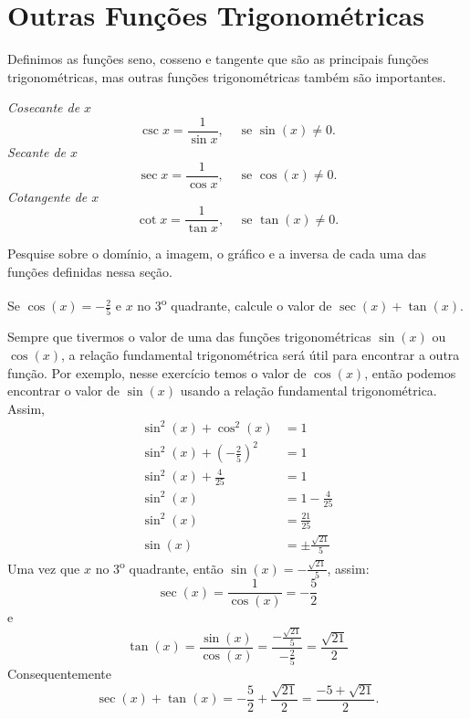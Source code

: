 \section{Outras Funções Trigonométricas}

Definimos as funções seno, cosseno e tangente que são as principais funções
trigonométricas, mas outras funções trigonométricas também são importantes.

\emph{Cosecante de $x$}
\[
  \csc x = \frac{1}{\sin x}, \quad\text{ se } \sin(x) \neq 0.
\]
\emph{Secante de $x$}
\[
  \sec x=\frac{1}{\cos x}, \quad\text{ se } \cos(x) \neq 0.
\]
\emph{Cotangente de $x$}
\[
  \cot x=\frac{1}{\tan x}, \quad\text{ se } \tan(x) \neq 0.
\]

\begin{example}
  Pesquise sobre o domínio, a imagem, o gráfico e a inversa de cada uma das
  funções definidas nessa seção.
\end{example}

\begin{example}
  Se \(\cos(x)= -\frac{2}{5}\) e $x$ no 3\textsuperscript{o} quadrante,
  calcule o valor de $\sec(x)+\tan(x)$.

  \solution
  Sempre que tivermos o valor de uma das funções trigonométricas $\sin(x)$ ou
  $\cos(x)$, a relação fundamental trigonométrica será útil para
  encontrar a outra função. Por exemplo, nesse exercício temos o valor de
  $\cos(x)$, então podemos encontrar o valor de $\sin(x)$ usando a
  relação fundamental trigonométrica. Assim,
  \begin{align*}
    \sin^2(x) + \cos^2(x)                     & = 1                       \\
    \sin^2(x) + \left( -\frac{2}{5} \right)^2 & = 1                       \\
    \sin^2(x) + \frac{4}{25}                  & = 1                       \\
    \sin^2(x)                                 & = 1- \frac{4}{25}         \\
    \sin^2(x)                                 & = \frac{21}{25}           \\
    \sin(x)                                   & = \pm \frac{\sqrt{21}}{5}
  \end{align*}
  Uma vez que $x$ no 3\textsuperscript{o} quadrante, então
  $\sin(x) = -\frac{\sqrt{21}}{5}$, assim:
  \[
    \sec(x)
    = \frac{1}{\cos(x)}
    =-\frac{5}{2}
  \]
  e
  \[
    \tan(x)
    = \frac{\sin(x)}{\cos(x)}
    =\frac{-\frac{\sqrt{21}}{5}}{-\frac{2}{5}}=\frac{\sqrt{21}}{2}
  \]
  Consequentemente
  \[
    \sec(x)+\tan(x)
    = -\frac{5}{2}+\frac{\sqrt{21}}{2}
    = \frac{-5+\sqrt{21}}{2}.
  \]
\end{example}

